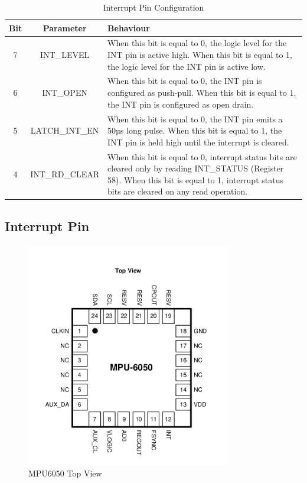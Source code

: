 \documentclass{article}
\begin{document}
	\begin{table}[h]
		\centering
		\begin{tabular}{|c|c|p{8cm}|} %
			\hline
			Bit & Parameter & Behaviour \\ %
			\hline
			7 & INT\_LEVEL & When this bit is equal to 0, the logic level for the INT pin is active high. When this bit is equal to 1, the logic level for the INT pin is active low. \\ 
			\hline
			6 & INT\_OPEN & When this bit is equal to 0, the INT pin is configured as push-pull. When this bit is equal to 1, the INT pin is configured as open drain. \\ 
			\hline
			5 & LATCH\_INT\_EN & When this bit is equal to 0, the INT pin emits a 50µs long pulse. When this bit is equal to 1, the INT pin is held high until the interrupt is cleared. \\ 
			\hline
			4 & INT\_RD\_CLEAR & When this bit is equal to 0, interrupt status bits are cleared only by reading INT\_STATUS (Register 58). When this bit is equal to 1, interrupt status bits are cleared on any read operation. \\ 
			\hline
		\end{tabular}
		\caption{Interrupt Pin Configuration}
		\label{tab:int_pin_cfg}
	\end{table}

	\subsection{Interrupt Pin}
	
	\begin{figure}[H]
		\centering
		\includegraphics[width=0.8\textwidth]{figs/mpu6050_top_view.png}
		\caption{MPU6050 Top View\cite{mpu6050-product-spec}}
		\label{fig:mpu_top_view}
	\end{figure}
\end{document}
